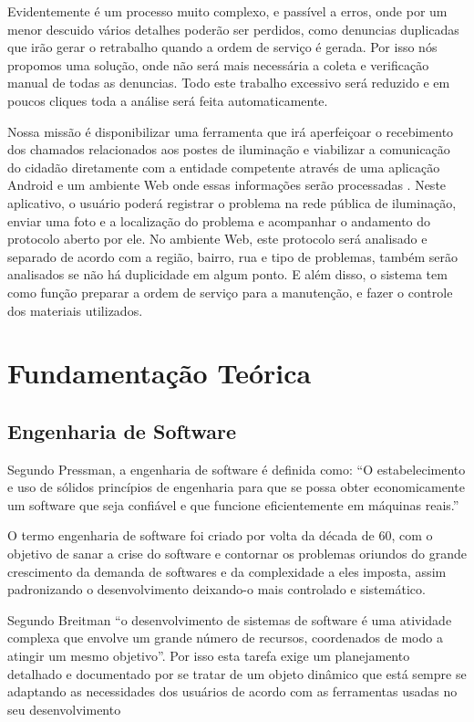 \documentclass[
	article,			%
	11pt,				%
	oneside,			%
	a4paper,			%
	english,			%
	brazil,				%
	sumario=tradicional
	]{abntex2}
\begin{document}
Evidentemente é um processo muito complexo, e passível a erros, onde por um
menor descuido vários detalhes poderão ser perdidos, como denuncias duplicadas
que irão gerar o retrabalho quando a ordem de serviço é gerada. Por isso nós
propomos uma solução, onde não será mais necessária a coleta e verificação
manual de todas as denuncias. Todo este trabalho excessivo será reduzido e em
poucos cliques toda a análise será feita automaticamente.

Nossa missão é disponibilizar uma ferramenta que irá aperfeiçoar o recebimento
dos chamados relacionados aos postes de iluminação e viabilizar a comunicação
do cidadão diretamente com a entidade competente  através de uma aplicação
Android e um ambiente Web onde essas informações serão processadas . Neste
aplicativo, o usuário poderá registrar o problema na rede pública de iluminação,
enviar uma foto e a localização do problema e acompanhar o andamento do
protocolo aberto por ele. No ambiente Web, este protocolo será analisado e
separado de acordo com a região, bairro, rua e tipo de problemas, também serão
analisados se não há duplicidade em algum ponto. E além disso, o sistema tem
como função preparar a ordem de serviço para a manutenção, e fazer o controle
dos materiais utilizados.

\section{Fundamentação Teórica}

\subsection{Engenharia de Software}

Segundo Pressman, a engenharia de software é definida como: “O estabelecimento
e uso de sólidos princípios de engenharia para que se possa obter economicamente
um software que seja confiável e que funcione eficientemente em máquinas reais.”\cite{pressman}

O termo engenharia de software foi criado por volta da década de 60, com o
objetivo de sanar a crise do software e contornar os problemas oriundos do
grande crescimento da demanda de softwares e da complexidade a eles imposta,
assim padronizando o desenvolvimento deixando-o mais controlado e sistemático.

Segundo Breitman “o desenvolvimento de sistemas de software é uma
atividade complexa que envolve um grande número de recursos, coordenados de
modo a atingir um mesmo objetivo”. \cite{breitman} Por isso esta tarefa exige um planejamento
detalhado e documentado por se tratar de um objeto dinâmico que está sempre se
adaptando as necessidades dos usuários de acordo com as ferramentas usadas no
seu desenvolvimento
\end{document}
